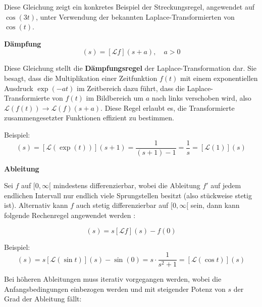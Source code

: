Diese Gleichung zeigt ein konkretes Beispiel der Streckungsregel, angewendet auf $\cos(3t)$, unter Verwendung der bekannten Laplace-Transformierten von $\cos(t)$.

\addvspace{1cm}
\textbf{Dämpfung}
\begin{equation}
    [\mathcal{L}(\exp(-at)f(t))](s) = [\mathcal{L}f](s + a), \quad a > 0
    \label{eq:laplace_exponentielle_modulation}
    \end{equation}

Diese Gleichung stellt die \textbf{Dämpfungsregel} der Laplace-Transformation dar. Sie besagt, dass die Multiplikation einer Zeitfunktion $f(t)$ mit einem exponentiellen Ausdruck $\exp(-at)$ im Zeitbereich dazu führt, dass die Laplace-Transformierte von $f(t)$ im Bildbereich um $a$ nach links verschoben wird, also $\mathcal{L}(f(t)) \to \mathcal{L}(f)(s + a)$. Diese Regel erlaubt es, die Transformierte zusammengesetzter Funktionen effizient zu bestimmen.


Beispiel:
\begin{equation}
    [\mathcal{L}(\exp(-t)\exp(t))](s) = [\mathcal{L}(\exp(t))](s + 1)
    = \frac{1}{(s + 1) - 1} = \frac{1}{s} = [\mathcal{L}(1)](s)
    \label{eq:laplace_exponential_beispiel}
    \end{equation}
    \cite[S.~884]{buch1}


    
\addvspace{1cm}
\textbf{Ableitung}

Sei $f$ auf $[0, \infty[$ mindestens differenzierbar, wobei die Ableitung $f'$ auf jedem endlichen Intervall nur endlich viele Sprungstellen besitzt (also stückweise stetig ist). Alternativ kann $f$ auch stetig differenzierbar auf $[0, \infty[$ sein, dann kann folgende Rechenregel angewendet werden \cite[S.~23]{buch3}:

\begin{equation}
    [\mathcal{L}(f')](s) = s[\mathcal{L}f](s) - f(0)
    \label{eq:laplace_ableitung}
    \end{equation}


Beispiel:
\begin{equation}
    [\mathcal{L}(\sin' t)](s) = s[\mathcal{L}(\sin t)](s) - \sin(0)
    = s \cdot \frac{1}{s^2 + 1} = [\mathcal{L}(\cos t)](s)
    \label{eq:laplace_ableitung_beispiel}
    \end{equation}
    \cite[S.~884]{buch1}
    

Bei höheren Ableitungen muss iterativ vorgegangen werden, wobei die Anfangsbedingungen einbezogen werden
und mit steigender Potenz von $s$ der Grad der Ableitung fällt:

